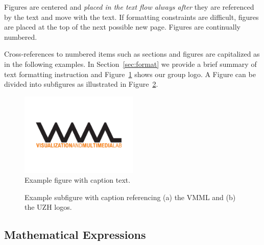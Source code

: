 \documentclass[11pt, a4paper,oneside,chapterprefix=false]{scrbook}
\begin{document}
Figures are centered and {\em placed in the text flow always after} they are referenced by the text and move with the text. If formatting constraints are difficult, figures are placed at the top of the next possible new page. Figures are continually numbered.

Cross-references to numbered items such as sections and figures are capitalized as in the following examples. In Section~\ref{sec:format} we provide a brief summary of text formatting instruction and Figure~\ref{fig:vmml} shows our group logo. A Figure can  be divided into subfigures as illustrated in Figure~\ref{fig:vmml_uni}.

\begin{figure}[htp]
 \centering
 \includegraphics[width=0.5\textwidth]{figures/vmml_logo}
 \caption{Example figure with caption text.}
 \label{fig:vmml}
\end{figure}

\begin{figure}[htp]
 \centering
{} \hfill
{}
 \caption{Example subfigure with caption referencing (a) the VMML and (b) the UZH logos.}
 \label{fig:vmml_uni}
\end{figure}


\subsection{Mathematical Expressions}
\end{document}
